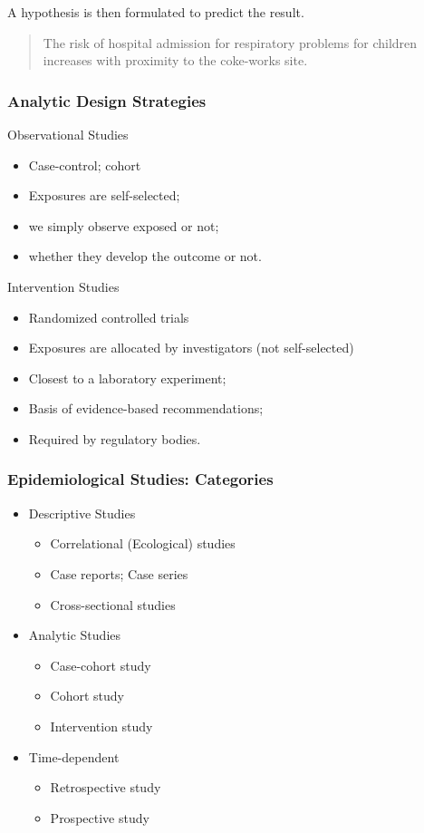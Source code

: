 \documentclass[table,10pt]{beamer}
\begin{document}
\begin{CJK*}{UTF8}{gbsn}
\begin{frame}
A hypothesis is then formulated to predict the result.
\begin{quote}
The risk of hospital admission for respiratory problems for children increases 
with proximity to the coke-works site.
\end{quote} 
\end{frame}


\begin{frame}[t]
\frametitle{Analytic Design Strategies}
\begin{block}{Observational Studies}
\begin{itemize}
	\item Case-control; cohort
	\item Exposures are self-selected;
	\item we simply observe exposed or not;
	\item whether they develop the outcome or not.
\end{itemize}
\end{block}
\begin{block}{Intervention Studies}
\begin{itemize}
	\item Randomized controlled trials
	\item Exposures are allocated by investigators (not self-selected)
	\item Closest to a laboratory experiment;
	\item Basis of evidence-based recommendations;
	\item Required by regulatory bodies.
\end{itemize}
\end{block}
\end{frame}


\begin{frame}[t]
\frametitle{Epidemiological Studies: Categories}
\begin{itemize}
	\item Descriptive Studies
	\begin{itemize}
		\item Correlational (Ecological) studies
		\item Case reports; Case series
		\item \alert{Cross-sectional studies}
	\end{itemize}
	\item Analytic Studies
	\begin{itemize}
		\item Case-cohort study
		\item Cohort study
		\item Intervention study
	\end{itemize}
	\item Time-dependent
	\begin{itemize}
		\item Retrospective study
		\item Prospective study
	\end{itemize}
\end{itemize}
\end{frame}



\end{CJK*}
\end{document}
